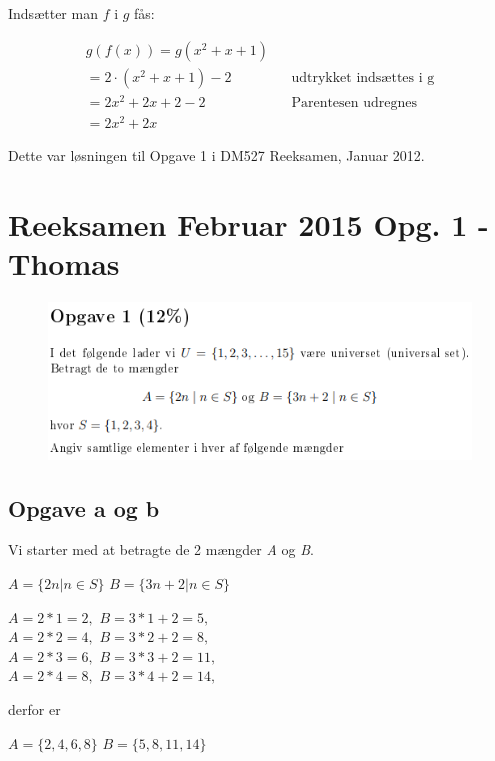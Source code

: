 \documentclass{article}
\begin{document}
Indsætter man $f$ i $g$ fås:
\begin{center}
\begin{align*}
g(f(x)) = g(x^2 + x + 1) \\
= 2 \cdot (x^2 + x + 1) - 2 && \text{udtrykket indsættes i g} \\
= 2x^2 + 2x + 2 - 2 && \text{Parentesen udregnes} \\
= 2x^2 + 2x
\end{align*}
\end{center}

Dette var løsningen til Opgave 1 i DM527 Reeksamen, Januar 2012.

\section{Reeksamen Februar 2015 Opg. 1 - Thomas}
\begin{figure}[h]
\includegraphics{2015Opgave1Formulering}
\end{figure}

\subsection*{Opgave a og b}
Vi starter med at betragte de 2 mængder \emph{A} og \emph{B}.

\begin{center}

$A = \{ 2n | n \in S \}$ \qquad $B = \{ 3n +2 | n \in S \}$

$A = 2 * 1 = 2,$ \qquad $B = 3 * 1 + 2 = 5, $\\
$A = 2 * 2 = 4,$ \qquad $B = 3 * 2 + 2 = 8, $\\
$A = 2 * 3 = 6,$ \qquad $B = 3 * 3 + 2 = 11, $\\
$A = 2 * 4 = 8,$ \qquad $B = 3 * 4 + 2 = 14, $

derfor er

$A = \{ 2, 4, 6, 8 \}$ \qquad $B = \{ 5, 8, 11, 14 \}$
\end{center}
\end{document}
